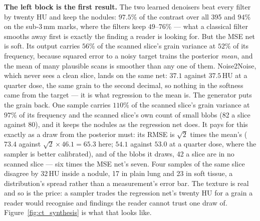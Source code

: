 \medskip\noindent \textbf{The left block is the first result.} The two learned
denoisers beat every filter by twenty HU and keep the nodules: $97.5\%$ of
the contrast over all 395 and $94\%$ on the sub-3\,mm marks, where the
filters keep $49$--$76\%$ --- what a classical filter smooths away first is
exactly the finding a reader is looking for. But the MSE net is soft. Its
output carries $56\%$ of the scanned slice's grain variance at $52\%$ of its
frequency, because squared error to a noisy target trains the posterior
\emph{mean}, and the mean of many plausible scans is smoother than any one
of them. Noise2Noise, which never sees a clean slice, lands on the same
net: $37.1$ against $37.5$\,HU at a quarter dose, the same grain to the
second decimal, so nothing in the softness came from the target --- it is
what regression to the mean is. The generator puts the grain back. One
sample carries $110\%$ of the scanned slice's grain variance at $97\%$ of
its frequency and the scanned slice's own count of small blobs (82 a slice
against 80), and it keeps the nodules as the regression net does. It pays
for this exactly as a draw from the posterior must: its RMSE is
$\sqrt{2}$ times the mean's ($73.4$ against $\sqrt{2} \times 46.1 = 65.3$
here; $54.1$ against $53.0$ at a quarter dose, where the sampler is better
calibrated), and of the blobs it draws, 42 a slice are in no scanned slice
--- six times the MSE net's seven. Four samples of the same slice disagree
by 32\,HU inside a nodule, 17 in plain lung and 23 in soft tissue, a
distribution's spread rather than a measurement's error bar. The texture is
real and so is the price: a sampler trades the regression net's twenty HU
for a grain a reader would recognise and findings the reader cannot trust
one draw of. Figure~\ref{fig:ct_synthesis} is what that looks like.

